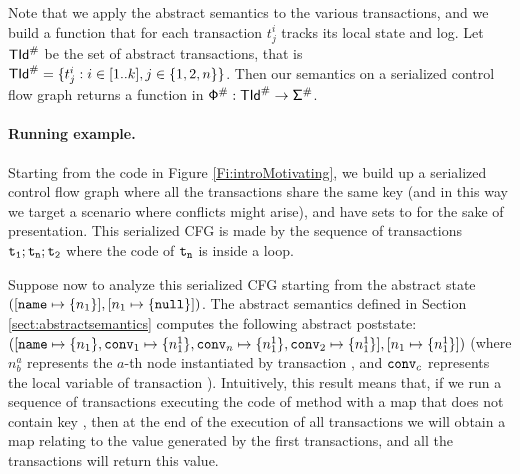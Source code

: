 Note that we apply the abstract semantics to the various transactions, and we build a function that for each transaction $t^i_j$ tracks its local state and log. Let $\mathsf{\mathsf{TId}}^\#$ be the set of abstract transactions, that is $\mathsf{\mathsf{TId}}^\# = \{t^i_j : i \in [1..k], j \in \{1, 2, n\}\}$. Then our semantics on a serialized control flow graph returns a function in $\mathsf{\mathsf{\Phi}}^\# : \mathsf{\mathsf{TId}}^\# \to \mathsf{\Sigma}^\#$.


\paragraph{Running example.}
Starting from the code in Figure \ref{Fi:introMotivating}, we build up a serialized control flow graph where all the transactions share the same key  (and in this way we target a scenario where conflicts might arise), and have  sets to  for the sake of presentation. This serialized CFG is made by the sequence of transactions $\mathtt{t_1}; \mathtt{t_n}; \mathtt{t_2}$ where the code of $\mathtt{t_n}$ is inside a loop.

Suppose now to analyze this serialized CFG starting from the abstract state $([\mathtt{name} \mapsto \{n_1\}], [n_1 \mapsto \{\mathtt{null}\}])$. The abstract semantics defined in Section \ref{sect:abstractsemantics} computes the following abstract poststate: $([\mathtt{name} \mapsto \{n_1\}, \mathtt{conv}_1 \mapsto \{n^1_1\}, \mathtt{conv}_n \mapsto \{n^1_1\}, \mathtt{conv}_2 \mapsto \{n^1_1\}], [n_1 \mapsto \{n^1_1\}])$ (where $n^a_b$ represents the $a$-th node instantiated by transaction , and $\mathtt{conv}_c$ represents the local variable  of transaction ). Intuitively, this result means that, if we run a sequence of transactions executing the code of method  with a map that does not contain key , then at the end of the execution of all transactions we will obtain a map relating  to the value generated by the first transactions, and all the transactions will return this value.

